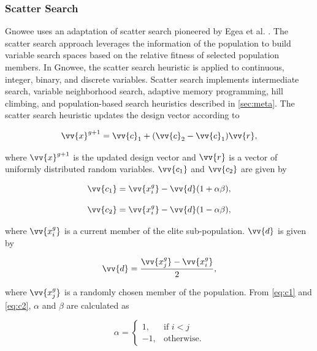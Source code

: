 \documentclass{article}                                                                           %
\begin{document}
\subsubsection{Scatter Search}
Gnowee uses an adaptation of scatter search pioneered by Egea et al. \cite{Egea2010}.
The scatter search approach leverages the information of the population to build variable search spaces based on the relative fitness of selected population members.
In Gnowee, the scatter search heuristic is applied to continuous, integer, binary, and discrete variables.
Scatter search implements intermediate search, variable neighborhood search, adaptive memory programming, hill climbing, and population-based search heuristics described in \autoref{sec:meta}. 
The scatter search heuristic updates the design vector according to 

\begin{equation}
  \vv{x}^{g+1} = \vv{c}_1 + (\vv{c}_2-\vv{c}_1) \vv{r},
\end{equation}

\noindent where $\vv{x}^{g+1}$ is the updated design vector and $\vv{r}$ is a vector of uniformly distributed random variables. 
$\vv{c_1}$ and $\vv{c_2}$ are given by

\begin{equation} \label{eq:c1}
  \vv{c_1} = \vv{x^g_i} - \vv{d}(1+\alpha \beta),
\end{equation}

\begin{equation} \label{eq:c2}
  \vv{c_2} = \vv{x^g_i} - \vv{d}(1-\alpha \beta),
\end{equation}

\noindent where $\vv{x^g_i}$ is a current member of the elite sub-population.
$\vv{d}$ is given by

\begin{equation}
  \vv{d} = \frac{\vv{x^g_j} - \vv{x^g_i}}{2},
\end{equation}

\noindent where $\vv{x^g_j}$ is a randomly chosen member of the population.
From \autoref{eq:c1} and \autoref{eq:c2}, $\alpha$ and $\beta$ are calculated as

\begin{equation}
  \alpha = 
    \begin{cases}
      1, & \text{if } i < j \\
      -1, & \text{otherwise.}
    \end{cases}
\end{equation}
\end{document}
